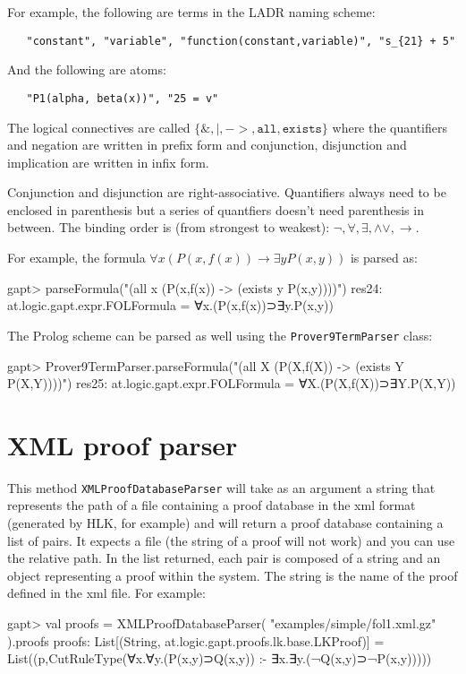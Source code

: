 \documentclass[a4paper,11pt]{article}
\renewcommand{\land}{\wedge}
\renewcommand{\lor}{\vee}
\begin{document}
\begin{appendix}
For example, the following are terms in the LADR naming scheme:

 \begin{lstlisting}
   "constant", "variable", "function(constant,variable)", "s_{21} + 5"
 \end{lstlisting}

And the following are atoms:

 \begin{lstlisting}
   "P1(alpha, beta(x))", "25 = v"
 \end{lstlisting}

The logical connectives are called $\{\mathtt{\&,|,->,all,exists}\}$ where
 the quantifiers and negation are written in prefix form and conjunction,
 disjunction and implication are written in infix form.

Conjunction and disjunction are right-associative. Quantifiers always need to
 be enclosed in parenthesis but a series of quantfiers doesn't need parenthesis
 in between. The binding order is (from strongest to weakest):
 $\mathtt{\neg,\forall,\exists,\land\lor,\rightarrow}$.


For example, the formula $\forall x (P(x,f(x)) \rightarrow \exists y P(x,y))$
 is parsed as:

\begin{clilisting}
gapt> parseFormula("(all x (P(x,f(x)) -> (exists y P(x,y))))")
res24: at.logic.gapt.expr.FOLFormula = ∀x.(P(x,f(x))⊃∃y.P(x,y))

\end{clilisting}

The Prolog scheme can be parsed as well using the \texttt{Prover9TermParser}
class:

\begin{clilisting}
gapt> Prover9TermParser.parseFormula("(all X (P(X,f(X)) -> (exists Y P(X,Y))))")
res25: at.logic.gapt.expr.FOLFormula = ∀X.(P(X,f(X))⊃∃Y.P(X,Y))

\end{clilisting}

\section{XML proof parser}\label{sec.fileio}

This method \texttt{XMLProofDatabaseParser} will take as an argument a string that represents the path of a file
containing a proof database in the xml format (generated by HLK, for example) and
will return a proof database containing a list 
of pairs. It expects a file (the string of a proof will not work) and you can use 
the relative path. In the list returned, each pair is composed of a string and 
an object representing a proof within the system. The string is the name of the 
proof defined in the xml file. For example:
%
\begin{clilisting}
gapt> val proofs = XMLProofDatabaseParser( "examples/simple/fol1.xml.gz" ).proofs
proofs: List[(String, at.logic.gapt.proofs.lk.base.LKProof)] = List((p,CutRuleType(∀x.∀y.(P(x,y)⊃Q(x,y)) :- ∃x.∃y.(¬Q(x,y)⊃¬P(x,y)))))


\end{clilisting}
\end{appendix}
\end{document}
